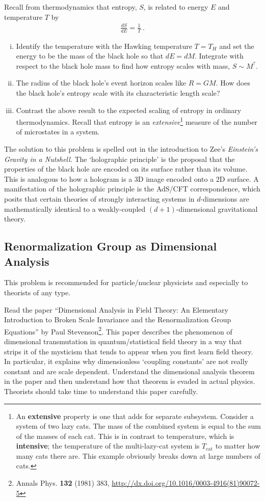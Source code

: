 \documentclass[12pt]{article}
\numberwithin{equation}{subsection}    %
\begin{document}
Recall from thermodynamics that entropy, $S$, is related to energy $E$ and temperature $T$ by
\begin{align}
	\frac{dS}{dE} = \frac{1}{T} \ .
\end{align}
\begin{enumerate}[(i)]
	\item Identify the temperature with the Hawking temperature $T=T_H$ and set the energy to be the mass of the black hole so that $dE = dM$. Integrate with respect to the black hole mass to find how entropy scales with mass, $S \sim M^?$.
	\item The radius of the black hole's event horizon scales like $R = GM$. How does the black hole's entropy scale with its characteristic length scale? 
	\item Contrast the above result to the expected scaling of entropy in ordinary thermodynamics. Recall that entropy is an \emph{extensive}\footnote{An \textbf{extensive} property is one that adds for separate subsystem. Consider a system of two lazy cats. The mass of the combined system is equal to the sum of the masses of each cat. This is in contrast to temperature, which is \textbf{intensive}; the temperature of the multi-lazy-cat system is $T_\text{cat}$ to matter how many cats there are. This example obviously breaks down at large numbers of cats.} measure of the number of microstates in a system.
\end{enumerate}

The solution to this problem is spelled out in  the introduction to Zee's \emph{Einstein's Gravity in a Nutshell}. The `holographic principle' is the proposal that the properties of the black hole are encoded on its surface rather than its volume. This is analogous to how a hologram is a 3D image encoded onto a 2D surface. A manifestation of the holographic principle is the AdS/CFT correspondence, which posits that certain theories of strongly interacting systems in $d$-dimensions are mathematically identical to a weakly-coupled $(d+1)$-dimensional gravitational theory.




\subsection{Renormalization Group as Dimensional Analysis}

This problem is recommended for particle/nuclear physicists and especially to theorists of any type.

Read the paper ``Dimensional Analysis in Field Theory: An Elementary Introduction to Broken Scale Invariance and the Renormalization Group Equations'' by Paul Stevenson\footnote{Annals Phys. \textbf{132} (1981) 383, \url{http://dx.doi.org/10.1016/0003-4916(81)90072-5}}. This paper describes the phenomenon of dimensional transmutation in quantum/statistical field theory in a way that strips it of the mysticism that tends to appear when you first learn field theory. In particular, it explains why dimensionless `coupling constants' are not really constant and are scale dependent. Understand the  dimensional analysis theorem in the paper and then understand how that theorem is evaded in actual physics. Theorists should take time to understand this paper carefully.\
\end{document}

